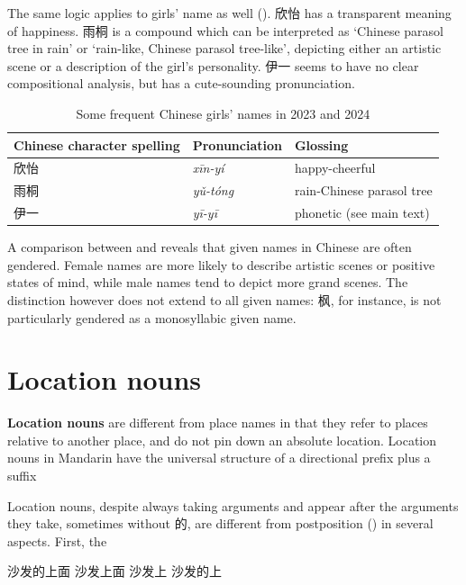 \documentclass[UTF8, a4paper, oneside, scheme=plain, 12pt]{ctexrep}
\newcommand*{\concept}[1]{\textbf{#1}}
\newcommand{\form}[1]{\emph{#1}}
\newcommand{\translate}[1]{`#1'}
\begin{document}
The same logic applies to girls' name as well ().
欣怡 has a transparent meaning of happiness.
雨桐 is a compound which can be interpreted as \translate{Chinese parasol tree in rain}
or \translate{rain-like, Chinese parasol tree-like},
depicting either an artistic scene or a description of the girl's personality.
伊一 seems to have no clear compositional analysis,
but has a cute-sounding pronunciation.

\begin{table}[H]
    \caption{Some frequent Chinese girls' names in 2023 and 2024}
    \label{tbl:girls-name}

    \centering
    \begin{tabular}{@{}lll@{}}
    \toprule
    Chinese character spelling & Pronunciation & Glossing \\ \midrule
    欣怡             & \form{xīn-yí}  & happy-cheerful    \\
    雨桐             & \form{yǔ-tóng} & rain-Chinese parasol tree  \\ 
    伊一             & \form{yī-yī}   & phonetic (see main text) \\
    \bottomrule
    \end{tabular}
\end{table}

A comparison between  and 
reveals that given names in Chinese are often gendered.
Female names are more likely to describe artistic scenes
or positive states of mind,
while male names tend to depict more grand scenes.
The distinction however does not extend to all given names:
枫, for instance, is not particularly gendered as a monosyllabic given name.

\section{Location nouns}

\concept{Location nouns} are different from place names in that they refer to
places relative to another place,
and do not pin down an absolute location.
Location nouns in Mandarin have the universal structure of a directional prefix
plus a suffix

Location nouns, despite always taking arguments and appear after the arguments they take,
sometimes without 的,
are different from postposition () in several aspects.
First, the 

\begin{exe}
    \ex \begin{xlist}
        \ex 沙发的上面
        \ex 沙发上面
        \ex 沙发上
        \ex *沙发的上
    \end{xlist}
\end{exe}
\end{document}
